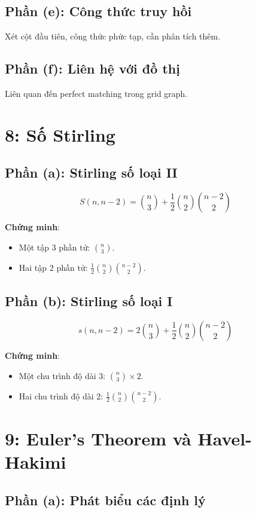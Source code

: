 \documentclass[a4paper,12pt]{article}
\theoremstyle{plain}
\theoremstyle{definition}
\begin{document}
\subsection*{Phần (e): Công thức truy hồi}
Xét cột đầu tiên, công thức phức tạp, cần phân tích thêm.

\subsection*{Phần (f): Liên hệ với đồ thị}
Liên quan đến perfect matching trong grid graph.

\section*{8: Số Stirling}

\subsection*{Phần (a): Stirling số loại II}
\[
S(n,n-2) = \binom{n}{3} + \frac{1}{2}\binom{n}{2}\binom{n-2}{2}
\]

\textbf{Chứng minh}:
\begin{itemize}
    \item Một tập 3 phần tử: \( \binom{n}{3} \).
    \item Hai tập 2 phần tử: \( \frac{1}{2}\binom{n}{2}\binom{n-2}{2} \).
\end{itemize}

\subsection*{Phần (b): Stirling số loại I}
\[
s(n,n-2) = 2\binom{n}{3} + \frac{1}{2}\binom{n}{2}\binom{n-2}{2}
\]

\textbf{Chứng minh}:
\begin{itemize}
    \item Một chu trình độ dài 3: \( \binom{n}{3} \times 2 \).
    \item Hai chu trình độ dài 2: \( \frac{1}{2}\binom{n}{2}\binom{n-2}{2} \).
\end{itemize}

\section*{9: Euler's Theorem và Havel-Hakimi}

\subsection*{Phần (a): Phát biểu các định lý}
\end{document}
